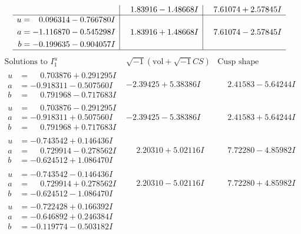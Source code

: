 \documentclass[1p]{elsarticle_modified}
\theoremstyle{definition}
\newcommand{\I}{\sqrt{-1}}
\begin{document}
$$\begin{array}{c|c|c}
 & \phantom{-}1.83916 - 1.48668 I & \phantom{-}7.61074 + 2.57845 I \\ \hline\begin{aligned}
u &= \phantom{-}0.096314 - 0.766780 I \\
a &= -1.116870 - 0.545298 I \\
b &= -0.199635 - 0.904057 I\end{aligned}
 & \phantom{-}1.83916 + 1.48668 I & \phantom{-}7.61074 - 2.57845 I\\
 \hline 
 \end{array}$$\newpage$$\begin{array}{c|c|c}  
\text{Solutions to }I^u_{1}& \I (\text{vol} + \sqrt{-1}CS) & \text{Cusp shape}\\
 \hline 
\begin{aligned}
u &= \phantom{-}0.703876 + 0.291295 I \\
a &= -0.918311 - 0.507560 I \\
b &= \phantom{-}0.791968 - 0.717683 I\end{aligned}
 & -2.39425 + 5.38386 I & \phantom{-}2.41583 - 5.64244 I \\ \hline\begin{aligned}
u &= \phantom{-}0.703876 - 0.291295 I \\
a &= -0.918311 + 0.507560 I \\
b &= \phantom{-}0.791968 + 0.717683 I\end{aligned}
 & -2.39425 - 5.38386 I & \phantom{-}2.41583 + 5.64244 I \\ \hline\begin{aligned}
u &= -0.743542 + 0.146436 I \\
a &= \phantom{-}0.729914 - 0.278562 I \\
b &= -0.624512 + 1.086470 I\end{aligned}
 & \phantom{-}2.20310 + 5.02116 I & \phantom{-}7.72280 - 4.85982 I \\ \hline\begin{aligned}
u &= -0.743542 - 0.146436 I \\
a &= \phantom{-}0.729914 + 0.278562 I \\
b &= -0.624512 - 1.086470 I\end{aligned}
 & \phantom{-}2.20310 - 5.02116 I & \phantom{-}7.72280 + 4.85982 I \\ \hline\begin{aligned}
u &= -0.722428 + 0.166392 I \\
a &= -0.646892 + 0.246384 I \\
b &= -0.119774 - 0.503182 I\end{aligned}

\end{array}$$
\end{document}
